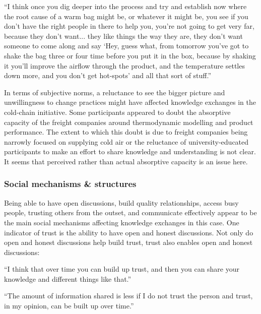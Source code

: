 \begin{displayquote}[Participant 1/1]
\small
\enquote{I think once you dig deeper into the process and try and establish now where the root cause of a warm bag might be, or whatever it might be, you see if you don't have the right people in there to help you, you’re not going to get very far, because they don't want... they like things the way they are, they don't want someone to come along and say \enquote{Hey, guess what, from tomorrow you've got to shake the bag three or four time before you put it in the box, because by shaking it you'll improve the airflow through the product, and the temperature settles down more, and you don't get hot-spots} and all that sort of stuff.} 
\end{displayquote}
 

In terms of subjective norms, a reluctance to see the bigger picture and unwillingness to change practices might have affected knowledge exchanges in the cold-chain initiative. Some participants appeared to doubt the absorptive capacity of the freight companies around thermodynamic modelling and product performance. The extent to which this doubt is due to freight companies being narrowly focused on supplying cold air or the reluctance of university-educated participants to make an effort to share knowledge and understanding is not clear. It seems that perceived rather than actual absorptive capacity is an issue here.

\subsubsection{Social mechanisms \& structures}

Being able to have open discussions, build quality relationships, access busy people, trusting others from the outset, and communicate effectively appear to be the main social mechanisms affecting knowledge exchanges in this case. One indicator of trust is the ability to have open and honest discussions. Not only do open and honest discussions help build trust, trust also enables open and honest discussions:

\begin{displayquote}[Participant 3/1]
\small
\enquote{I think that over time you can build up trust, and then you can share your knowledge and different things like that.} 
\end{displayquote}
 

\begin{displayquote}[Participant 10/1]
\small
\enquote{The amount of information shared is less if I do not trust the person and trust, in my opinion, can be built up over time.} 
\end{displayquote}
 

